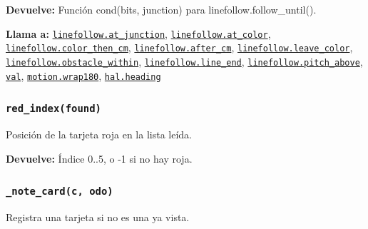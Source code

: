 \par{}\par\smallskip
\noindent\textbf{Devuelve:} Función cond(bits, junction) para linefollow.follow\_until().\par
\noindent\textbf{Llama a:} \hyperref[fn:linefollow:at-junction]{\texttt{linefollow.at\_\allowbreak{}junction}}, \hyperref[fn:linefollow:at-color]{\texttt{linefollow.at\_\allowbreak{}color}}, \hyperref[fn:linefollow:color-then-cm]{\texttt{linefollow.color\_\allowbreak{}then\_\allowbreak{}cm}}, \hyperref[fn:linefollow:after-cm]{\texttt{linefollow.after\_\allowbreak{}cm}}, \hyperref[fn:linefollow:leave-color]{\texttt{linefollow.leave\_\allowbreak{}color}}, \hyperref[fn:linefollow:obstacle-within]{\texttt{linefollow.obstacle\_\allowbreak{}within}}, \hyperref[fn:linefollow:line-end]{\texttt{linefollow.line\_\allowbreak{}end}}, \hyperref[fn:linefollow:pitch-above]{\texttt{linefollow.pitch\_\allowbreak{}above}}, \hyperref[fn:autonomous:val]{\texttt{val}}, \hyperref[fn:motion:wrap180]{\texttt{motion.wrap180}}, \hyperref[fn:hal:heading]{\texttt{hal.heading}}\par

\subsubsection{\texttt{red\_\allowbreak{}index(found)}}\label{fn:autonomous:red-index}
\noindent Posición de la tarjeta roja en la lista leída.

\par{}\par\smallskip
\noindent\textbf{Devuelve:} Índice 0..5, o -1 si no hay roja.\par

\subsubsection{\texttt{\_\allowbreak{}note\_\allowbreak{}card(c, odo)}}\label{fn:autonomous:-note-card}
\noindent Registra una tarjeta si no es una ya vista.

